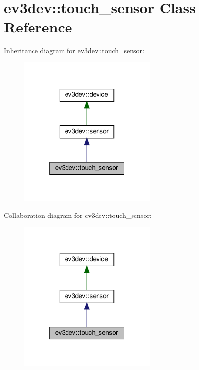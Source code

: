 \hypertarget{classev3dev_1_1touch__sensor}{}\section{ev3dev\+:\+:touch\+\_\+sensor Class Reference}
\label{classev3dev_1_1touch__sensor}


Inheritance diagram for ev3dev\+:\+:touch\+\_\+sensor\+:
\nopagebreak
\begin{figure}[H]
\begin{center}
\leavevmode
\includegraphics[width=193pt]{classev3dev_1_1touch__sensor__inherit__graph}
\end{center}
\end{figure}


Collaboration diagram for ev3dev\+:\+:touch\+\_\+sensor\+:
\nopagebreak
\begin{figure}[H]
\begin{center}
\leavevmode
\includegraphics[width=193pt]{classev3dev_1_1touch__sensor__coll__graph}
\end{center}
\end{figure}

